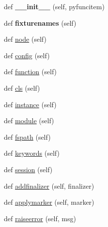 \begin{DoxyCompactItemize}
\item 
\mbox{\label{class__pytest_1_1fixtures_1_1_fixture_request_ae031615d46a9a9ae4036e0860ce290f7}} 
def {\bfseries \+\_\+\+\_\+init\+\_\+\+\_\+} (self, pyfuncitem)
\item 
\mbox{\label{class__pytest_1_1fixtures_1_1_fixture_request_a99ba28e6393d7f6f9586966987820ec9}} 
def {\bfseries fixturenames} (self)
\item 
def \hyperlink{class__pytest_1_1fixtures_1_1_fixture_request_ad363bf4f5e5846e32c2f4d1468e0a74e}{node} (self)
\item 
def \hyperlink{class__pytest_1_1fixtures_1_1_fixture_request_ae41f6d70a2ddfd056f6a2d73d1029b84}{config} (self)
\item 
def \hyperlink{class__pytest_1_1fixtures_1_1_fixture_request_a10c225d34b909de4e4f5cdc82cb38898}{function} (self)
\item 
def \hyperlink{class__pytest_1_1fixtures_1_1_fixture_request_ad5b658c8c4dab7339e2ae529f2f63b28}{cls} (self)
\item 
def \hyperlink{class__pytest_1_1fixtures_1_1_fixture_request_a82d8c64637664a475cacd0fa4f5fe15a}{instance} (self)
\item 
def \hyperlink{class__pytest_1_1fixtures_1_1_fixture_request_aa457e0a0e07c11337096d90398db010b}{module} (self)
\item 
def \hyperlink{class__pytest_1_1fixtures_1_1_fixture_request_a4974a2a4bcab4c73ae32e131c06180ff}{fspath} (self)
\item 
def \hyperlink{class__pytest_1_1fixtures_1_1_fixture_request_aa35d76f59a1e72f33960df812ff36844}{keywords} (self)
\item 
def \hyperlink{class__pytest_1_1fixtures_1_1_fixture_request_af3d8460bd359cc34d2b086cf2fed4472}{session} (self)
\item 
def \hyperlink{class__pytest_1_1fixtures_1_1_fixture_request_abecbd3112fdcd3d0c541fd59066a3dc6}{addfinalizer} (self, finalizer)
\item 
def \hyperlink{class__pytest_1_1fixtures_1_1_fixture_request_a0e23d2c6b917b1732e1cff59040c0f94}{applymarker} (self, marker)
\item 
def \hyperlink{class__pytest_1_1fixtures_1_1_fixture_request_af9a9e65ea190f5af08d128dd68a3fc6f}{raiseerror} (self, msg)
\item 

\end{DoxyCompactItemize}
